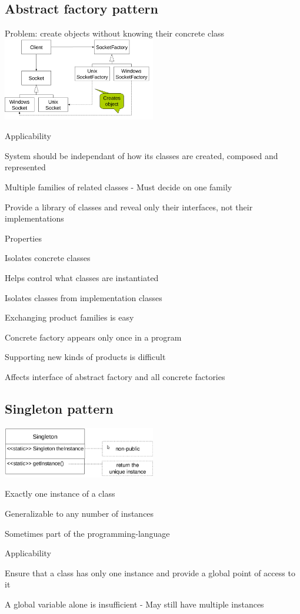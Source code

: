 \documentclass[10pt]{article}
\begin{document}
\subsection{Abstract factory pattern}
\enumstart
	\item Problem: create objects without knowing their concrete class
	\\ \includegraphics[width=0.5\textwidth]{abstract_factory_pattern.png}
	\item Applicability
	\enumstart
		\item System should be independant of how its classes are created, composed and represented
		\item Multiple families of related classes - Must decide on one family
		\item Provide a library of classes and reveal only their interfaces, not their implementations
	\enumend
	\item Properties
	\enumstart
		\item Isolates concrete classes
		\enumstart
			\item Helps control what classes are instantiated
			\item Isolates classes from implementation classes
		\enumend
		\item Exchanging product families is easy
		\enumstart
			\item Concrete factory appears only once in a program
		\enumend
		\item Supporting new kinds of products is difficult
		\enumstart
			\item Affects interface of abstract factory and all concrete factories
		\enumend
	\enumend
\enumend

\subsection{Singleton pattern}
\includegraphics[width=0.5\textwidth]{singleton_pattern.png}
\enumstart
	\item Exactly one instance of a class
	\item Generalizable to any number of instances
	\item Sometimes part of the programming-language
	\item Applicability
	\enumstart
		\item Ensure that a class has only one instance and provide a global point of access to it
		\item A global variable alone is insufficient - May still have multiple instances
	\enumend
\enumend
\end{document}
